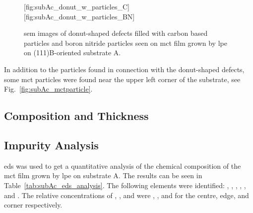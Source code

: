 \begin{figure}[htbp]
    \centering
    [fig:subAc_donut_w_particles_C]
    \hfill
    [fig:subAc_donut_w_particles_BN]
    \caption[\Ac{sem} images of donut-shaped defects filled with carbon based particles and boron nitride particles.]{\Ac{sem} images of donut-shaped defects filled with  carbon based particles and  boron nitride particles seen on \ac{mct} film grown by \ac{lpe} on (111)B-oriented substrate A.}
    \label{fig:subAc_donut_w_particles}
\end{figure}

In addition to the particles found in connection with the donut-shaped defects, some \ac{mct} particles were found near the upper left corner of the substrate, see Fig.~\ref{fig:subAc_mctparticle}.

\subsection{Composition and Thickness}


\subsection{Impurity Analysis}

\Ac{eds} was used to get a quantitative analysis of the chemical composition of the \ac{mct} film grown by \ac{lpe} on substrate A. The results can be seen in Table~\ref{tab:subAc_eds_analysis}. The following elements were identified: , , , , , and . The relative concentrations of , , and  were , , and  for the centre, edge, and corner respectively. 


